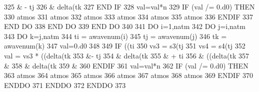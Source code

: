 \begin{DoxyCode}
325                      & - tj%
326                      & delta(tk%
327 \textcolor{keywordflow}{             END IF}
328              val=val*n
329              \textcolor{keywordflow}{IF} (val /= 0.d0) \textcolor{keywordflow}{THEN}
330                 atmos%
331                 atmos%
332                 atmos%
333                 atmos%
334                 atmos%
335                 atmos%
336 \textcolor{keywordflow}{             ENDIF}
337 \textcolor{keywordflow}{          END DO}
338 \textcolor{keywordflow}{       END DO}
339 \textcolor{keywordflow}{    END DO}
340 
341     \textcolor{keywordflow}{DO} i=1,natm
342        \textcolor{keywordflow}{DO} j=i,natm
343           \textcolor{keywordflow}{DO} k=j,natm
344              ti = awavenum(i)
345              tj = awavenum(j)
346              tk = awavenum(k)
347              val=0.d0
348 
349              \textcolor{keywordflow}{IF} ((ti%
350                 vs3 = s3(tj%
351                 vs4 = s4(tj%
352                 val = vs3 * ((delta(tk%
353                      &- tj%
354                      & delta(tk%
355                      & + ti%
356                      & ((delta(tk%
357                      &%
358                      & delta(tk%
359                      &%
360 \textcolor{keywordflow}{             ENDIF}
361              val=val*n
362              \textcolor{keywordflow}{IF} (val /= 0.d0) \textcolor{keywordflow}{THEN}
363                 atmos%
364                 atmos%
365                 atmos%
366                 atmos%
367                 atmos%
368                 atmos%
369 \textcolor{keywordflow}{             ENDIF}
370 \textcolor{keywordflow}{          ENDDO}
371 \textcolor{keywordflow}{       ENDDO}
372 \textcolor{keywordflow}{    ENDDO}
373 
\end{DoxyCode}
